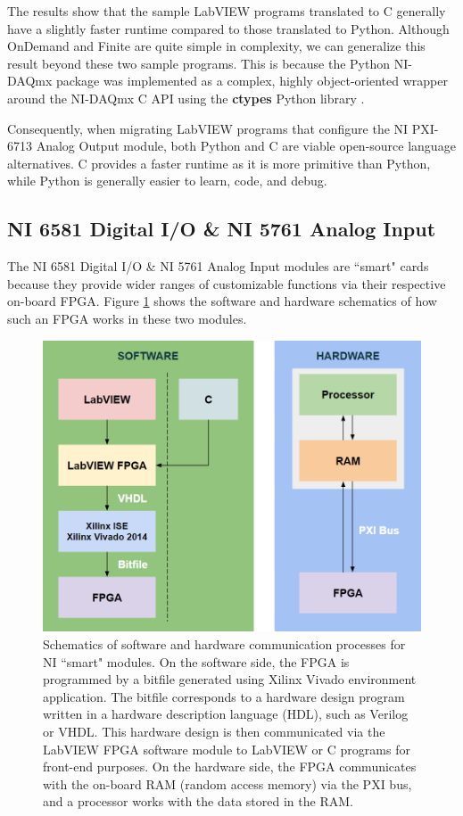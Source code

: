 The results show that the sample LabVIEW programs translated to C generally have a slightly faster runtime compared to those translated to Python. Although OnDemand and Finite are quite simple in complexity, we can generalize this result beyond these two sample programs. This is because the Python NI-DAQmx package was implemented as a complex, highly object-oriented wrapper around the NI-DAQmx C API using the \textbf{ctypes} Python library \cite{ni_nidaqmx_python}.

Consequently, when migrating LabVIEW programs that configure the NI PXI-6713 Analog Output module, both Python and C are viable open-source language alternatives. C provides a faster runtime as it is more primitive than Python, while Python is generally easier to learn, code, and debug.

\subsection{NI 6581 Digital I/O \& NI 5761 Analog Input}

The NI 6581 Digital I/O \& NI 5761 Analog Input modules are ``smart" cards because they provide wider ranges of customizable functions via their respective on-board FPGA. Figure \ref{fig:ch1_schematics} shows the software and hardware schematics of how such an FPGA works in these two modules.

\begin{figure}[ht]
    \centering
    \includegraphics[width=0.75\columnwidth]{images/chapter_1/schematics.png}
    \caption{Schematics of software and hardware communication processes for NI ``smart" modules. On the software side, the FPGA is programmed by a bitfile generated using Xilinx Vivado environment application. The bitfile corresponds to a hardware design program written in a hardware description language (HDL), such as Verilog or VHDL. This hardware design is then communicated via the LabVIEW FPGA software module to LabVIEW or C programs for front-end purposes. On the hardware side, the FPGA communicates with the on-board RAM (random access memory) via the PXI bus, and a processor works with the data stored in the RAM.}
    \label{fig:ch1_schematics}
\end{figure}

